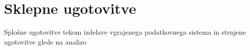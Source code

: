 \documentclass[a4paper,12pt,openright]{book}
\begin{document}
\chapter{Sklepne ugotovitve}
    \colorbox{BurntOrange}{Splošne ugotovitve tekom izdelave vgrajenega podatkovnega sistema}
    \newline
    \colorbox{BurntOrange}{in strnjene ugotovitve glede na analizo}


\raggedright

\printbibliography[heading=bibintoc,title={Literatura}]
\end{document}

